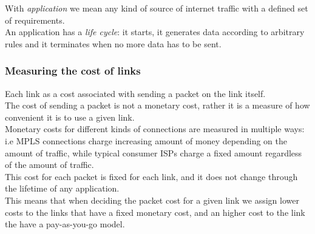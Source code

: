 \documentclass{article}
\begin{document}
\begin{mdframed}[hidealllines=true,backgroundcolor=blue!20]
	With \textit{application} we mean any kind of source of internet traffic with a defined set of requirements. \\
	An application has a \textit{life cycle}: it starts, it generates data according to arbitrary rules and it terminates when no more data has to be sent. 
\end{mdframed} 



\subsubsection{Measuring the cost of links} \label{link_cost}
Each link as a cost associated with sending a packet on the link itself. \\
The cost of sending a packet is not a monetary cost, rather it is a measure of how convenient it is to use a given link. \\
Monetary costs for different kinds of connections are measured in multiple ways: i.e   MPLS connections charge increasing amount of money depending on the amount of traffic, while typical consumer ISPs charge a fixed amount regardless of the amount of traffic. \\
This cost for each packet is fixed for each link, and it does not change through the lifetime of any application. \\
This means that when deciding the packet cost for a given link we assign lower costs to the links that have a fixed monetary cost, and an higher cost to the link the have a pay-as-you-go model.



\end{document}
